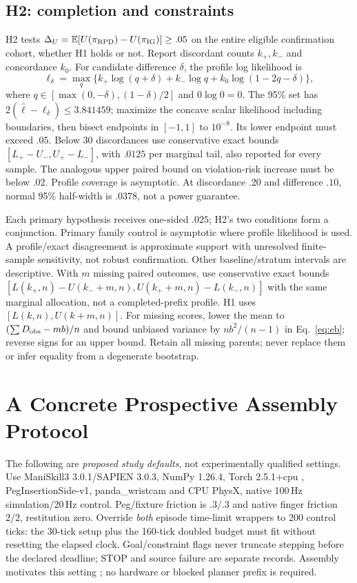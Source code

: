 \subsection{H2: completion and constraints}
H2 tests $\Delta_U=\mathbb E[U(\pi_{\rm RPD})-U(\pi_{\rm IG})]\ge .05$ on the entire eligible confirmation cohort, whether H1 holds or not. Report discordant counts $k_+,k_-$ and concordance $k_0$. For candidate difference $\delta$, the profile log likelihood \citep{wilks1938} is
\begin{equation}
\ell_\delta=\max_q\{k_+\log(q+\delta)+k_-\log q
+k_0\log(1-2q-\delta)\},
\end{equation}
where $q\in[\max(0,-\delta),(1-\delta)/2]$ and $0\log0=0$. The 95\% set has $2(\widehat\ell-\ell_\delta)\le3.841459$; maximize the concave scalar likelihood including boundaries, then bisect endpoints in $[-1,1]$ to $10^{-8}$. Its lower endpoint must exceed $.05$. Below 30 discordances use conservative exact bounds $[L_+-U_-,U_+-L_-]$, with $.0125$ per marginal tail, also reported for every sample. The analogous upper paired bound on violation-risk increase must be below $.02$. Profile coverage is asymptotic. At discordance $.20$ and difference $.10$, normal 95\% half-width is $.0378$, not a power guarantee.

Each primary hypothesis receives one-sided $.025$; H2's two conditions form a conjunction. Primary family control is asymptotic where profile likelihood is used. A profile/exact disagreement is approximate support with unresolved finite-sample sensitivity, not robust confirmation. Other baseline/stratum intervals are descriptive. With $m$ missing paired outcomes, use conservative exact bounds $[L(k_+,n)-U(k_-+m,n),U(k_++m,n)-L(k_-,n)]$ with the same marginal allocation, not a completed-prefix profile. H1 uses $[L(k,n),U(k+m,n)]$. For missing scores, lower the mean to $(\sum D_{\rm obs}-mb)/n$ and bound unbiased variance by $nb^2/(n-1)$ in Eq.~\eqref{eq:eb}; reverse signs for an upper bound. Retain all missing parents; never replace them or infer equality from a degenerate bootstrap.

\section{A Concrete Prospective Assembly Protocol}
The following are \emph{proposed study defaults}, not experimentally qualified settings. Use ManiSkill3 3.0.1/SAPIEN 3.0.3, NumPy 1.26.4, Torch 2.5.1+cpu \citep{tao2025}, PegInsertionSide-v1, panda\_wristcam and CPU PhysX, native 100\,Hz simulation/20\,Hz control. Peg/fixture friction is $.3/.3$ and native finger friction $2/2$, restitution zero. Override \emph{both} episode time-limit wrappers to 200 control ticks: the 30-tick setup plus the 160-tick doubled budget must fit without resetting the elapsed clock. Goal/constraint flags never truncate stepping before the declared deadline; STOP and source failure are separate records. Assembly motivates this setting \citep{tang2023}; no hardware or blocked planner prefix is required.

